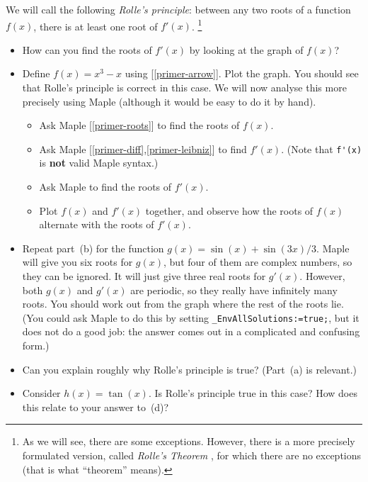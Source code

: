 \documentclass[a4paper,10pt]{amsbook}
\begin{document}
\begin{exercise}\label{ex-rolle}
 We will call the following \emph{Rolle's principle}: between any two
 roots of a function $f(x)$, there is at least one root of $f'(x)$. 
 \footnote{ As we will see, there are some exceptions.  However, there
   is a more precisely formulated version, called \emph{Rolle's
   Theorem} , for which there are no exceptions (that is what
   ``theorem'' means).  
 } 
 \begin{itemize}
  \item[(a)] How can you find the roots of $f'(x)$ by looking at the
   graph of $f(x)$? 
  \item[(b)] Define $f(x)=x^3-x$ using [\ref{primer-arrow}]. 
   Plot the graph.  You should see that Rolle's principle is
   correct in this case.  We will now analyse this more precisely using
   Maple (although it would be easy to do it by hand). 
   \begin{itemize}
    \item Ask Maple [\ref{primer-roots}] to find the roots of $f(x)$. 
    \item Ask Maple [\ref{primer-diff},\ref{primer-leibniz}] to find
     $f'(x)$.  (Note that \verb~f'(x)~ is \textbf{not} valid
     Maple syntax.) 
    \item Ask Maple to find the roots of $f'(x)$. 
    \item Plot $f(x)$ and $f'(x)$ together, and observe how the roots
     of $f(x)$ alternate with the roots of $f'(x)$. 
   \end{itemize}
  \item[(c)] Repeat part~(b) for the function
   $g(x)=\sin(x)+\sin(3x)/3$.  Maple will give you six roots for
   $g(x)$, but four of them are complex numbers, so they can be
   ignored.  It will just give three real roots for $g'(x)$.  However,
   both $g(x)$ and $g'(x)$ are periodic, so they really have
   infinitely many roots.  You should work out from the graph
   where the rest of the roots lie.  (You could ask Maple to do this
   by setting \verb~_EnvAllSolutions:=true;~, but it does not do a
   good job: the answer comes out in a complicated and confusing
   form.) 
  \item[(d)] Can you explain roughly why Rolle's principle is true? 
   (Part~(a) is relevant.) 
  \item[(e)] Consider $h(x)=\tan(x)$.  Is Rolle's principle true in
   this case?  How does this relate to your answer to~(d)?  
 \end{itemize}
\end{exercise}
\end{document}
